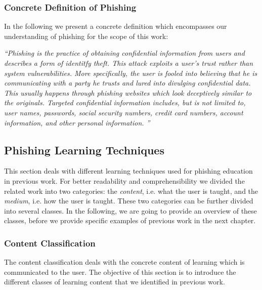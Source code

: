 \subsubsection{Concrete Definition of Phishing}
In the following we present a concrete definition which encompasses our understanding of phishing for the scope of this work:

\begin{center}
\textit{``Phishing is the practice of obtaining confidential information from users and describes a form of identitfy theft. This attack exploits a user's trust rather than system vulnerabilities. More specifically, the user is fooled into believing that he is communicating with a party he trusts and lured into divulging confidential data. This usually happens through phishing websites which look deceptively similar to the originals. Targeted confidential information includes, but is not limited to, user names, passwords, social security numbers, credit card numbers, account information, and other personal information.
''}
\end{center}

\subsection{Phishing Learning Techniques}

This section deals with different learning techniques used for phishing education in previous work.
 For better readability and comprehensibility we divided the related work into two categories: the \textit{content}, i.e.
 what the user is taught, and the 
\textit{medium}, i.e. how the user is taught.
These two categories can be further divided into several classes. 
In the following, we are going to provide an overview of these classes, before we provide specific examples of previous work in the next chapter.


\subsubsection{Content Classification}
\label{s:content_classification}
The content classification deals with the concrete content of learning which is communicated to the user. 
The objective of this section is to introduce the different classes of learning content that we identified in previous work.

